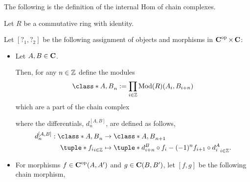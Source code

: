 The following is the definition of the internal Hom of chain complexes. 
\begin{definition}
    \label{def:internal_hom_of_chain_complexes_over_Mod(R)}
    Let \( R \) be a commutative ring with identity.
    
    Let \( [?_1, ?_2] \) be the following assignment of objects and morphisms in \( \operatorname{\mathbf{C}}^{\operatorname{op}} \times \operatorname{\mathbf{C}} \):

    \begin{itemize}
        \item {
            Let \( A, B \in \operatorname{\mathbf{C}} \).

            Then, for any \( n \in {\mathbb{Z}} \) define the modules
            \[
                \class*{A, B}_n := \prod_{i \in \Zb} \Mod(R)(A_i, B_{i + n})
            \]
            which are a part of the chain complex
            \begin{center}
            \end{center}
            where the differentials, \( d_n^{[A, B]} \), are defined as follows,
            \begin{align*}
                d_n^{[A, B]} : \class*{A, B}_n &\to \class*{A, B}_{n + 1} \\
                \tuple*{f_i}_{i \in \Zb} &\mapsto \tuple*{d_{i + n}^B \circ f_i - (-1)^n f_{i + 1} \circ d_i^A}_{i \in \Zb}.
            \end{align*}
        }
        \item {
            For morphisms \( f \in \operatorname{\mathbf{C}}^{\operatorname{op}}(A, A') \) and \( g \in \operatorname{\mathbf{C}}(B, B') \), let \( [f, g] \) be the following chain morphism,
            \begin{center}
\end{center}}
\end{itemize}
\end{definition}
